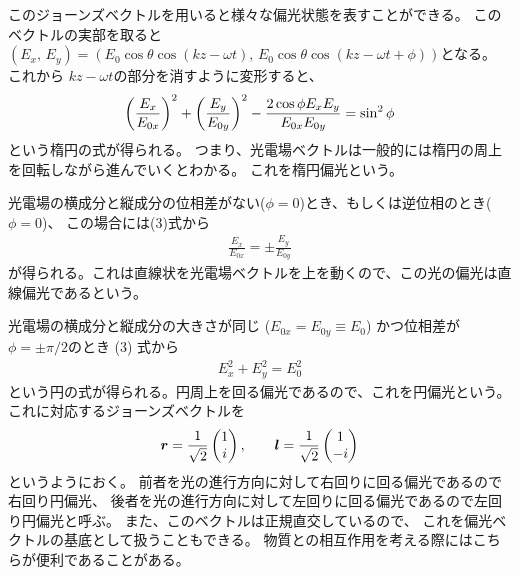 \documentclass[9pt,dvipdfmx,a4paper]{jsarticle}
\begin{document}
このジョーンズベクトルを用いると様々な偏光状態を表すことができる。
このベクトルの実部を取ると
\((E_x,\,E_y) = (E_0\cos\theta\cos(kz-\omega t),\,E_0\cos\theta\cos(kz-\omega t+\phi) )\)となる。
これから \(kz-\omega t\)の部分を消すように変形すると、
\begin{align}
    \qty(\frac{E_x}{E_{0x}})^2 + \qty(\frac{E_y}{E_{0y}})^2
    - \frac{2\cos\phi E_x E_y}{E_{0x}E_{0y}} = \sin^2\phi
\end{align}
という楕円の式が得られる。
つまり、光電場ベクトルは一般的には楕円の周上を回転しながら進んでいくとわかる。
これを楕円偏光という。

光電場の横成分と縦成分の位相差がない(\(\phi=0\))とき、もしくは逆位相のとき(\(\phi=0\))、
この場合には(3)式から
\begin{align}
    \frac{E_x}{E_{0x}} = \pm \frac{E_y}{E_{0y}}
\end{align}
が得られる。これは直線状を光電場ベクトルを上を動くので、この光の偏光は直線偏光であるという。

光電場の横成分と縦成分の大きさが同じ (\(E_{0x}=E_{0y}\equiv E_0\)) かつ位相差が\(\phi=\pm\pi/2\)のとき
(3) 式から
\begin{align}
    E_x^2 + E_y^2 = E_0^2
\end{align}
という円の式が得られる。円周上を回る偏光であるので、これを円偏光という。
これに対応するジョーンズベクトルを
\begin{align}
    \vb*{r} = \frac{1}{\sqrt{2}}
    \begin{pmatrix}
        1\\i
    \end{pmatrix},\qquad
    \vb*{l} = \frac{1}{\sqrt{2}}
    \begin{pmatrix}
        1\\-i
    \end{pmatrix}
\end{align}
というようにおく。
前者を光の進行方向に対して右回りに回る偏光であるので右回り円偏光、
後者を光の進行方向に対して左回りに回る偏光であるので左回り円偏光と呼ぶ。
また、このベクトルは正規直交しているので、
これを偏光ベクトルの基底として扱うこともできる。
物質との相互作用を考える際にはこちらが便利であることがある。
\end{document}
